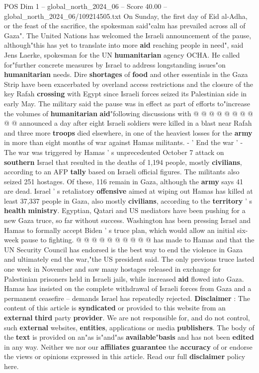 \begin{textsample}{POS Dim 1 – global\_north\_2024\_06 – Score 40.00 – global\_north\_2024\_06/109214505.txt}
On Sunday, the first day of Eid al-Adha, or the feast of the sacrifice, the spokesman said"calm has prevailed across all of Gaza".
The United Nations has welcomed the Israeli announcement of the pause, although"this has yet to translate into more \textbf{aid} reaching people in need", said Jens Laerke, spokesman for the UN \textbf{humanitarian} agency OCHA.
He called for"further concrete measures by Israel to address longstanding issues"on \textbf{humanitarian} needs.
Dire \textbf{shortages} of \textbf{food} and other essentials in the Gaza Strip have been exacerbated by overland access restrictions and the closure of the key Rafah \textbf{crossing} with Egypt since Israeli forces seized its Palestinian side in early May.
The military said the pause was in effect as part of efforts to"increase the volumes of \textbf{humanitarian} \textbf{aid}"following discussions with @ @ @ @ @ @ @ @ @ @ announced a day after eight Israeli soldiers were killed in a blast near Rafah and three more \textbf{troops} died elsewhere, in one of the heaviest losses for the \textbf{army} in more than eight months of war against Hamas militants. - ' End the war ' - The war was triggered by Hamas ' s unprecedented October 7 attack on \textbf{southern} Israel that resulted in the deaths of 1,194 people, mostly \textbf{civilians}, according to an AFP \textbf{tally} based on Israeli official figures.
The militants also seized 251 hostages.
Of these, 116 remain in Gaza, although the \textbf{army} says 41 are dead.
Israel ' s retaliatory \textbf{offensive} aimed at wiping out Hamas has killed at least 37,337 people in Gaza, also mostly \textbf{civilians}, according to the \textbf{territory} ' s \textbf{health} \textbf{ministry}.
Egyptian, Qatari and US mediators have been pushing for a new Gaza truce, so far without success.
Washington has been pressing Israel and Hamas to formally accept Biden ' s truce plan, which would allow an initial six-week pause to fighting. @ @ @ @ @ @ @ @ @ @ has made to Hamas and that the UN Security Council has endorsed is the best way to end the violence in Gaza and ultimately end the war,"the US president said.
The only previous truce lasted one week in November and saw many hostages released in exchange for Palestinian prisoners held in Israeli jails, while increased \textbf{aid} flowed into Gaza.
Hamas has insisted on the complete withdrawal of Israeli forces from Gaza and a permanent ceasefire -- demands Israel has repeatedly rejected. \textbf{Disclaimer} : The content of this article is \textbf{syndicated} or provided to this website from an \textbf{external} \textbf{third} party \textbf{provider}.
We are not responsible for, and do not control, such \textbf{external} websites, \textbf{entities}, applications or media \textbf{publishers}.
The body of the \textbf{text} is provided on an"as is"and"as \textbf{available}"\textbf{basis} and has not been \textbf{edited} in any way.
Neither we nor our \textbf{affiliates} \textbf{guarantee} the \textbf{accuracy} of or endorse the views or opinions expressed in this article.
Read our full \textbf{disclaimer} policy here.


\end{textsample}
